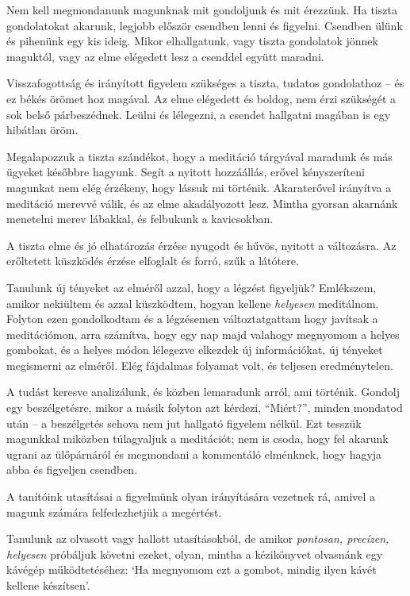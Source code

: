 Nem kell megmondanunk magunknak mit gondoljunk és mit érezzünk. Ha
tiszta gondolatokat akarunk, legjobb először csendben lenni és figyelni.
Csendben ülünk és pihenünk egy kis ideig. Mikor elhallgatunk, vagy
tiszta gondolatok jönnek maguktól, vagy az elme elégedett lesz a
csenddel együtt maradni.

Visszafogottság és irányított figyelem szükséges a tiszta, tudatos
gondolathoz -- és ez békés örömet hoz magával. Az elme elégedett és
boldog, nem érzi szükségét a sok belső párbeszédnek. Leülni és
lélegezni, a csendet hallgatni magában is egy hibátlan öröm.

Megalapozzuk a tiszta szándékot, hogy a meditáció tárgyával maradunk és
más ügyeket későbbre hagyunk. Segít a nyitott hozzáállás, erővel
kényszeríteni magunkat nem elég érzékeny, hogy lássuk mi történik.
Akaraterővel irányítva a meditáció merevvé válik, és az elme
akadályozott lesz. Mintha gyorsan akarnánk menetelni merev lábakkal, és
felbukunk a kavicsokban.

A tiszta elme és jó elhatározás érzése nyugodt és hűvös, nyitott a
változásra. Az erőltetett küszködés érzése elfoglalt és forró, szűk a
látótere.


Tanulunk új tényeket az elméről azzal, hogy a légzést figyeljük?
Emlékszem, amikor nekiültem és azzal küszködtem, hogyan kellene
\emph{helyesen} meditálnom. Folyton ezen gondolkodtam és a légzésemen
változtatgattam hogy javítsak a meditációmon, arra számítva, hogy egy
nap majd valahogy megnyomom a helyes gombokat, és a helyes módon
lélegezve elkezdek új információkat, új tényeket megismerni az elméről.
Elég fájdalmas folyamat volt, és teljesen eredménytelen.

A tudást keresve analizálunk, és közben lemaradunk arról, ami történik.
Gondolj egy beszélgetésre, mikor a másik folyton azt kérdezi,
``Miért?'', minden mondatod után -- a beszélgetés sehova nem jut
hallgató figyelem nélkül. Ezt tesszük magunkkal miközben túlagyaljuk a
meditációt; nem is csoda, hogy fel akarunk ugrani az ülőpárnáról és
megmondani a kommentáló elménknek, hogy hagyja abba és figyeljen
csendben.

A tanítóink utasításai a figyelmünk olyan irányítására vezetnek rá,
amivel a magunk számára felfedezhetjük a megértést.

Tanulunk az olvasott vagy hallott utasításokból, de amikor
\emph{pontosan, precízen, helyesen} próbáljuk követni ezeket, olyan,
mintha a kézikönyvet olvasnánk egy kávégép működtetéséhez: `Ha megnyomom
ezt a gombot, mindig ilyen kávét kellene készítsen'.

